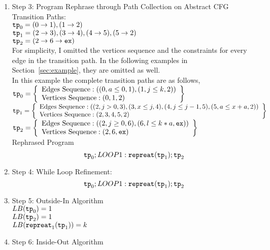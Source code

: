 \begin{enumerate}
  \item Step 3: Program Rephrase through Path Collection on Abstract CFG
  \\
  Transition Paths:
  \\
  $\mathtt{tp}_0 =  (0 \to 1), (1 \to 2)$
  \\
  $\mathtt{tp}_1 =  (2 \to 3), (3 \to 4), (4 \to 5), (5 \to 2)$
  \\
  $\mathtt{tp}_2 = (2 \to 6 \to \mathtt{ex})$
  \\
  For simplicity, I omitted the vertices sequence and the constraints for every edge in the transition path. 
  In the following examples in Section~\ref{sec:example}, they 
  are omitted as well. 
  \\
  In this example the complete transition paths are as follows,
  \\
  $\tpath_0 =  
    \left\{ \begin{array}{l}
    \text{Edges Sequence}: ((0, a \leq 0, 1), (1, j \leq k, 2))
    \\
    \text{Vertices Sequence}: (0, 1, 2)
    \end{array}\right\}
  $
  \\
  $\tpath_1 =  
  \left\{ \begin{array}{l}
    \text{Edges Sequence}: ((2, j > 0, 3), (3, x \leq j, 4), (4, j \leq j - 1, 5), (5, a \leq x + a, 2))
    \\
    \text{Vertices Sequence}: (2, 3, 4, 5, 2)
    \end{array}\right\}
  $
  \\
  $\tpath_2 = 
  \left\{ \begin{array}{l}
    \text{Edges Sequence}: ((2, j \geq 0, 6), (6, l \leq k*a, \lex))
    \\
    \text{Vertices Sequence}: (2, 6, \lex)
    \end{array}\right\}
    $
  \\
  Rephrased Program
  \[
  \mathtt{tp}_0 ; LOOP1: \mathtt{repreat}(\mathtt{tp}_1); \mathtt{tp}_2
  \]
  \item Step 4: While Loop Refinement:
  \[
    \mathtt{tp}_0 ; LOOP1: \mathtt{repreat}(\mathtt{tp}_1); \mathtt{tp}_2
  \]
  \item Step 5: Outside-In Algorithm
  \\
  $LB(\mathtt{tp}_0) = 1$
  \\
  $LB(\mathtt{tp}_2) = 1$
  \\
  $LB(\mathtt{repreat}_1(\mathtt{tp}_1)) = k $
  \item Step 6: Inside-Out Algorithm
  \begin{itemize}

\end{itemize}
\end{enumerate}
